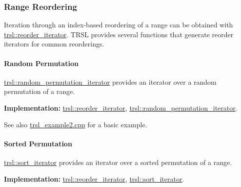 \hypertarget{group__products_products_reorder}{}\subsubsection{Range Reordering}\label{group__products_products_reorder}
Iteration through an index-\/based reordering of a range can be obtained with \hyperlink{classtrsl_1_1reorder__iterator}{trsl::reorder\_\-iterator}. TRSL provides several functions that generate reorder iterators for common reorderings.\hypertarget{group__products_products_permutation}{}\paragraph{Random Permutation}\label{group__products_products_permutation}
\hyperlink{namespacetrsl_afb566791dfade70af49beaa5b816e7ee}{trsl::random\_\-permutation\_\-iterator} provides an iterator over a random permutation of a range.


\begin{DoxyDescription}
\item[{\bfseries Implementation:}]\hyperlink{classtrsl_1_1reorder__iterator}{trsl::reorder\_\-iterator}, \hyperlink{namespacetrsl_afb566791dfade70af49beaa5b816e7ee}{trsl::random\_\-permutation\_\-iterator}.
\end{DoxyDescription}

\begin{DoxySeeAlso}{See also}
\hyperlink{trsl__example2_8cpp-example}{trsl\_\-example2.cpp} for a basic example.
\end{DoxySeeAlso}
\hypertarget{group__products_products_sorting}{}\paragraph{Sorted Permutation}\label{group__products_products_sorting}
\hyperlink{namespacetrsl_aa23892a3c8929e627df1618c6b5dd2df}{trsl::sort\_\-iterator} provides an iterator over a sorted permutation of a range.


\begin{DoxyDescription}
\item[{\bfseries Implementation:}]\hyperlink{classtrsl_1_1reorder__iterator}{trsl::reorder\_\-iterator}, \hyperlink{namespacetrsl_aa23892a3c8929e627df1618c6b5dd2df}{trsl::sort\_\-iterator}.
\end{DoxyDescription}



 